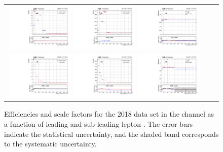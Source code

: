 {\begin{figure}[h]
  \begin{center}
    \begin{tabular}{ccc}
      \includegraphics[width=0.32\textwidth]{fig_2018_TrigSF/g_lepApt_mumu_MC.pdf}
      \includegraphics[width=0.32\textwidth]{fig_2018_TrigSF/g_lepApt_mumu_data.pdf}
      \includegraphics[width=0.32\textwidth]{fig_2018_TrigSF/g_mumu_lepApt_FullSystUncBand.pdf}\\
      \includegraphics[width=0.32\textwidth]{fig_2018_TrigSF/g_lepBpt_mumu_MC.pdf}
      \includegraphics[width=0.32\textwidth]{fig_2018_TrigSF/g_lepBpt_mumu_data.pdf}
      \includegraphics[width=0.32\textwidth]{fig_2018_TrigSF/g_mumu_lepBpt_FullSystUncBand.pdf}\\
    \end{tabular}
    \caption{Efficiencies and scale factors for the 2018 data set in the \mumu channel as a function of leading and sub-leading lepton \pT.
            The error bars indicate the statistical uncertainty, and the shaded band corresponds to the systematic uncertainty.
            }
    \label{TrigSF_2018_3}
  \end{center}
\end{figure}

}
